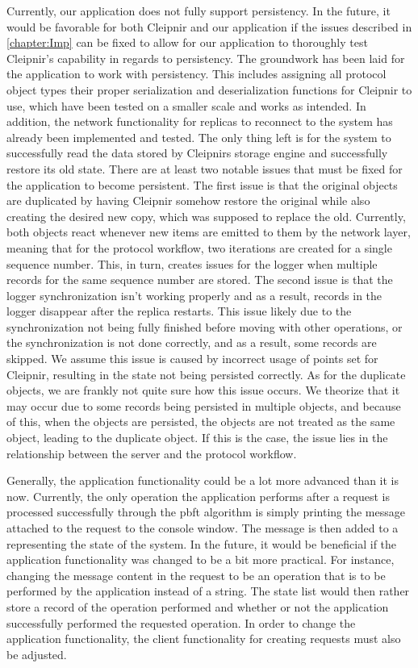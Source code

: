 Currently, our application does not fully support persistency. In the future, it would be favorable for both Cleipnir and our application if the issues described in \autoref{chapter:Imp} can be fixed to allow for our application to thoroughly test Cleipnir’s capability in regards to persistency. The groundwork has been laid for the application to work with persistency. This includes assigning all protocol object types their proper serialization and deserialization functions for Cleipnir to use, which have been tested on a smaller scale and works as intended. In addition, the network functionality for replicas to reconnect to the system has already been implemented and tested. The only thing left is for the system to successfully read the data stored by Cleipnirs storage engine and successfully restore its old state.
There are at least two notable issues that must be fixed for the application to become persistent. The first issue is that the original  objects are duplicated by having Cleipnir somehow restore the original  while also creating the desired new copy, which was supposed to replace the old. Currently, both  objects react whenever new items are emitted to them by the network layer, meaning that for the protocol workflow, two iterations are created for a single sequence number. This, in turn, creates issues for the logger when multiple records for the same sequence number are stored. The second issue is that the logger synchronization isn’t working properly and as a result, records in the logger disappear after the replica restarts. This issue likely due to the synchronization not being fully finished before moving with other operations, or the synchronization is not done correctly, and as a result, some records are skipped. We assume this issue is caused by incorrect usage of  points set for Cleipnir, resulting in the state not being persisted correctly. As for the duplicate  objects, we are frankly not quite sure how this issue occurs. We theorize that it may occur due to some records being persisted in multiple objects, and because of this, when the objects are persisted, the objects are not treated as the same  object, leading to the duplicate  object. If this is the case, the issue lies in the relationship between the server and the protocol workflow.

Generally, the application functionality could be a lot more advanced than it is now. Currently, the only operation the application performs after a request is processed successfully through the \ac{pbft} algorithm is simply printing the message attached to the request to the console window. The message is then added to a  representing the state of the system. In the future, it would be beneficial if the application functionality was changed to be a bit more practical. For instance, changing the message content in the request to be an operation that is to be performed by the application instead of a string. The state list would then rather store a record of the operation performed and whether or not the application successfully performed the requested operation. In order to change the application functionality, the client functionality for creating requests must also be adjusted.

